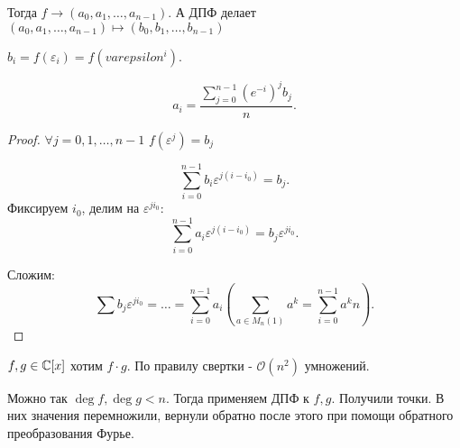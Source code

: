 Тогда  $f \to (a_0, a_1,\ldots, a_{n-1})$. А ДПФ делает $(a_0, a_1, \ldots, a_{n-1}) \mapsto (b_0, b_1, \ldots, b_{n-1})$

$b_i = f(\varepsilon_i) = f(varepsilon^i)$.

\begin{theorem}
    \[
        a_i = \frac{\sum_{j=0}^{n-1}(e^{-i})^j b_j}{n}
    .\] 
\end{theorem}
\begin{proof}
    $\forall j = 0, 1, \ldots, n - 1$ $f(\varepsilon^j) = b_j$

    \[\sum_{i = 0}^{n-1} b_i \varepsilon^{j(i-i_0)} = b_j.\] 
    Фиксируем $i_0$, делим на  $\varepsilon^{ji_0}$:
    \[
    \sum_{i=0}^{n-1} a_i \varepsilon^{j(i-i_0)} = b_j \varepsilon^{ji_0}
    .\] 

    Сложим:
    \[
    \sum b_j \varepsilon^{ji_0} = \ldots = \sum_{i=0}^{n-1}a_i\left(\sum_{a \in M_n(1)} a^k = \sum_{i=0}^{n-1} a^k n \right)
    .\] 
\end{proof}

$f, g \in \mathbb{C}[x]$ хотим  $f\cdot g$. По правилу свертки -  $\mathcal{O}(n^2)$ умножений.

Можно так  $\deg f, \deg g < n$. Тогда применяем ДПФ к  $f, g$. Получили точки. В них значения перемножили, вернули обратно после этого при помощи обратного преобразования Фурье.


